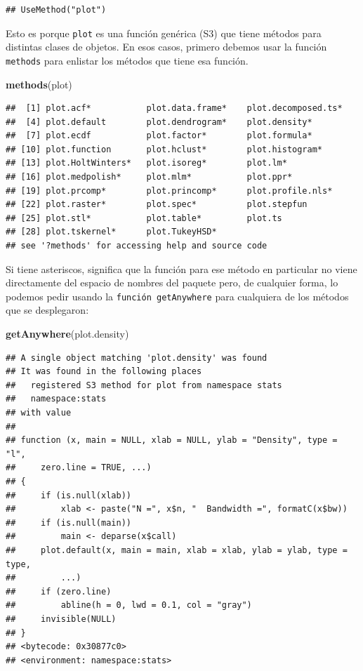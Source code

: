 \documentclass[]{article}
\newenvironment{Shaded}{\begin{snugshade}}{\end{snugshade}}
\newcommand{\KeywordTok}[1]{\textcolor[rgb]{0.13,0.29,0.53}{\textbf{#1}}}
\newcommand{\NormalTok}[1]{#1}
\begin{document}
\begin{verbatim}
## UseMethod("plot")
\end{verbatim}

Esto es porque \texttt{plot} es una función genérica (S3) que tiene
métodos para distintas clases de objetos. En esos casos, primero debemos
usar la función \texttt{methods} para enlistar los métodos que tiene esa
función.

\begin{Shaded}
\begin{Highlighting}[]
\KeywordTok{methods}\NormalTok{(plot)}
\end{Highlighting}
\end{Shaded}

\begin{verbatim}
##  [1] plot.acf*           plot.data.frame*    plot.decomposed.ts*
##  [4] plot.default        plot.dendrogram*    plot.density*      
##  [7] plot.ecdf           plot.factor*        plot.formula*      
## [10] plot.function       plot.hclust*        plot.histogram*    
## [13] plot.HoltWinters*   plot.isoreg*        plot.lm*           
## [16] plot.medpolish*     plot.mlm*           plot.ppr*          
## [19] plot.prcomp*        plot.princomp*      plot.profile.nls*  
## [22] plot.raster*        plot.spec*          plot.stepfun       
## [25] plot.stl*           plot.table*         plot.ts            
## [28] plot.tskernel*      plot.TukeyHSD*     
## see '?methods' for accessing help and source code
\end{verbatim}

Si tiene asteriscos, significa que la función para ese método en
particular no viene directamente del espacio de nombres del paquete
pero, de cualquier forma, lo podemos pedir usando la
\texttt{función\ getAnywhere} para cualquiera de los métodos que se
desplegaron:

\begin{Shaded}
\begin{Highlighting}[]
\KeywordTok{getAnywhere}\NormalTok{(plot.density)}
\end{Highlighting}
\end{Shaded}

\begin{verbatim}
## A single object matching 'plot.density' was found
## It was found in the following places
##   registered S3 method for plot from namespace stats
##   namespace:stats
## with value
## 
## function (x, main = NULL, xlab = NULL, ylab = "Density", type = "l", 
##     zero.line = TRUE, ...) 
## {
##     if (is.null(xlab)) 
##         xlab <- paste("N =", x$n, "  Bandwidth =", formatC(x$bw))
##     if (is.null(main)) 
##         main <- deparse(x$call)
##     plot.default(x, main = main, xlab = xlab, ylab = ylab, type = type, 
##         ...)
##     if (zero.line) 
##         abline(h = 0, lwd = 0.1, col = "gray")
##     invisible(NULL)
## }
## <bytecode: 0x30877c0>
## <environment: namespace:stats>
\end{verbatim}
\end{document}
